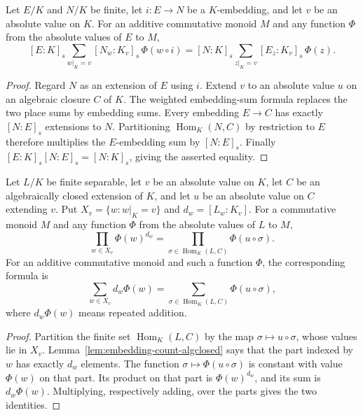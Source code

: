 \begin{lemma}
\label{lem:weighted-separable-embedding-pullback}
\leanok
{}
Let $E/K$ and $N/K$ be finite, let $i:E\to N$ be a $K$-embedding,
and let $v$ be an absolute value on $K$. For an additive commutative
monoid $M$ and any function $\Phi$ from the absolute values of $E$ to $M$,
\[
 [E:K]_s\sum_{w|_K=v}[N_w:K_v]_s\,\Phi(w\circ i)
 =
 [N:K]_s\sum_{z|_K=v}[E_z:K_v]_s\,\Phi(z).
\]
\end{lemma}
\begin{proof}
Regard $N$ as an extension of $E$ using $i$. Extend $v$ to an
absolute value $u$ on an algebraic closure $C$ of $K$. The weighted
embedding-sum formula replaces the two place sums by embedding sums.
Every embedding $E\to C$ has exactly $[N:E]_s$ extensions to $N$.
Partitioning $\operatorname{Hom}_K(N,C)$ by restriction to $E$
therefore multiplies the $E$-embedding sum by $[N:E]_s$.
Finally $[E:K]_s[N:E]_s=[N:K]_s$, giving the asserted equality.
\end{proof}

\begin{lemma}
\label{lem:weighted-embedding-sums}
\leanok
{}
Let $L/K$ be finite separable, let $v$ be an absolute value on $K$,
let $C$ be an algebraically closed extension of $K$, and let $u$ be
an absolute value on $C$ extending $v$. Put
$X_v=\{w:w|_K=v\}$ and $d_w=[L_w:K_v]$.
For a commutative monoid $M$ and any function $\Phi$ from the
absolute values of $L$ to $M$,
\[
 \prod_{w\in X_v}\Phi(w)^{d_w}
 =\prod_{\sigma\in\operatorname{Hom}_K(L,C)}\Phi(u\circ\sigma).
\]
For an additive commutative monoid and such a function $\Phi$,
the corresponding formula is
\[
 \sum_{w\in X_v}d_w\Phi(w)
 =\sum_{\sigma\in\operatorname{Hom}_K(L,C)}\Phi(u\circ\sigma),
\]
where $d_w\Phi(w)$ means repeated addition.
\end{lemma}
\begin{proof}
Partition the finite set $\operatorname{Hom}_K(L,C)$ by the map
$\sigma\mapsto u\circ\sigma$, whose values lie in $X_v$.
Lemma~\ref{lem:embedding-count-algclosed} says that the part indexed
by $w$ has exactly $d_w$ elements. The function
$\sigma\mapsto\Phi(u\circ\sigma)$ is constant with value $\Phi(w)$
on that part. Its product on that part is $\Phi(w)^{d_w}$, and its
sum is $d_w\Phi(w)$. Multiplying, respectively adding, over the parts
gives the two identities.
\end{proof}

